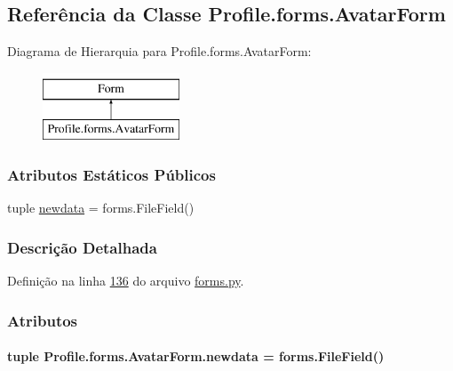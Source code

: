 \hypertarget{classProfile_1_1forms_1_1AvatarForm}{\subsection{Referência da Classe Profile.\-forms.\-Avatar\-Form}
\label{classProfile_1_1forms_1_1AvatarForm}
}
Diagrama de Hierarquia para Profile.\-forms.\-Avatar\-Form\-:\begin{figure}[H]
\begin{center}
\leavevmode
\includegraphics[height=2.000000cm]{da/da4/classProfile_1_1forms_1_1AvatarForm}
\end{center}
\end{figure}
\subsubsection*{Atributos Estáticos Públicos}
\begin{DoxyCompactItemize}
\item 
tuple \hyperlink{classProfile_1_1forms_1_1AvatarForm_af61dac7a51640ffe7d4e51aef53631ce}{newdata} = forms.\-File\-Field()
\end{DoxyCompactItemize}


\subsubsection{Descrição Detalhada}


Definição na linha \hyperlink{Profile_2forms_8py_source_l00136}{136} do arquivo \hyperlink{Profile_2forms_8py_source}{forms.\-py}.



\subsubsection{Atributos}
\hypertarget{classProfile_1_1forms_1_1AvatarForm_af61dac7a51640ffe7d4e51aef53631ce}{
\paragraph[{newdata}]{\setlength{\rightskip}{0pt plus 5cm}tuple Profile.\-forms.\-Avatar\-Form.\-newdata = forms.\-File\-Field()\hspace{0.3cm}{\ttfamily [static]}}}\label{classProfile_1_1forms_1_1AvatarForm_af61dac7a51640ffe7d4e51aef53631ce}


